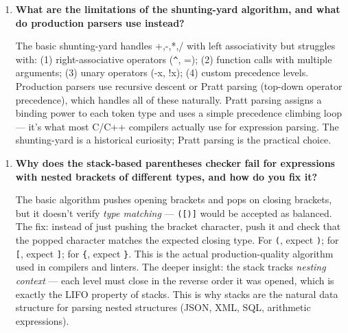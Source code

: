 \begin{enumerate}
\item \textbf{What are the limitations of the shunting-yard algorithm, and what do production parsers use instead?}

The basic shunting-yard handles +,-,*,/ with left associativity but struggles with: (1) right-associative operators (\texttt{\^{}}, =); (2) function calls with multiple arguments; (3) unary operators (-x, !x); (4) custom precedence levels. Production parsers use recursive descent or Pratt parsing (top-down operator precedence), which handles all of these naturally. Pratt parsing assigns a binding power to each token type and uses a simple precedence climbing loop — it's what most C/C++ compilers actually use for expression parsing. The shunting-yard is a historical curiosity; Pratt parsing is the practical choice.
\end{enumerate}

\begin{enumerate}
\item \textbf{Why does the stack-based parentheses checker fail for expressions with nested brackets of different types, and how do you fix it?}

The basic algorithm pushes opening brackets and pops on closing brackets, but it doesn't verify \textit{type matching} — \texttt{([)]} would be accepted as balanced. The fix: instead of just pushing the bracket character, push it and check that the popped character matches the expected closing type. For \texttt{(}, expect \texttt{)}; for \texttt{[}, expect \texttt{]}; for \texttt{\{}, expect \texttt{\}}. This is the actual production-quality algorithm used in compilers and linters. The deeper insight: the stack tracks \textit{nesting context} — each level must close in the reverse order it was opened, which is exactly the LIFO property of stacks. This is why stacks are the natural data structure for parsing nested structures (JSON, XML, SQL, arithmetic expressions).
\end{enumerate}

